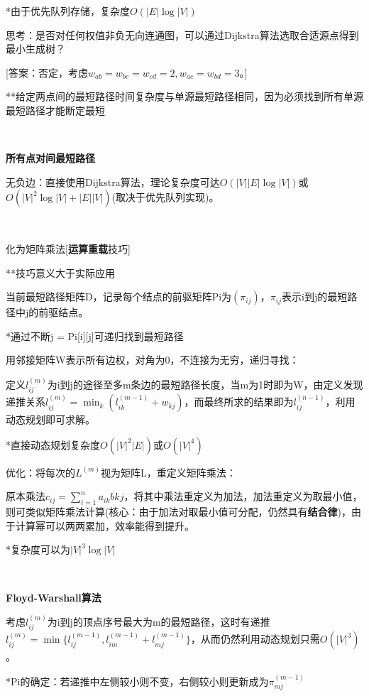 \documentclass[a4paper,UTF8,fontset=windows]{ctexart}
\begin{document}
*\hspace{0em}由于优先队列存储，复杂度$O(|E|\log|V|)$

思考：是否对任何权值非负无向连通图，可以通过Dijkstra算法选取合适源点得到最小生成树？

[答案：否定，考虑$w_{ab}=w_{bc}=w_{cd}=2,w_{ac}=w_{bd}=3$。]

**\hspace{0em}给定两点间的最短路径时间复杂度与单源最短路径相同，因为必须找到所有单源最短路径才能断定最短

\

\textbf{所有点对间最短路径}

无负边：直接使用Dijkstra算法，理论复杂度可达$O(|V||E|\log|V|)$或$O(|V|^2\log|V|+|E||V|)$(取决于优先队列实现)。

\

化为矩阵乘法[\textbf{运算重载}技巧]

**技巧意义大于实际应用

当前最短路径矩阵D，记录每个结点的前驱矩阵Pi为$(\pi_{ij})$，$\pi_{ij}$表示i到j的最短路径中j的前驱结点。

*\hspace{0em}通过不断j = Pi[i][j]可递归找到最短路径

用邻接矩阵W表示所有边权，对角为0，不连接为无穷，递归寻找：

定义$l_{ij}^{(m)}$为i到j的途径至多m条边的最短路径长度，当m为1时即为W，由定义发现递推关系$l_{ij}^{(m)}=\min_k(l_{ik}^{(m-1)}+w_{kj})$，而最终所求的结果即为$l_{ij}^{(n-1)}$，利用动态规划即可求解。

*\hspace{0em}直接动态规划复杂度$O(|V|^2|E|)$或$O(|V|^4)$

优化：将每次的$L^{(m)}$视为矩阵L，重定义矩阵乘法：

原本乘法$c_{ij}=\sum_{i=1}^na_{ik}b{kj}$，将其中乘法重定义为加法，加法重定义为取最小值，则可类似矩阵乘法计算(核心：由于加法对取最小值可分配，仍然具有\textbf{结合律})，由于计算幂可以两两累加，效率能得到提升。

*\hspace{0em}复杂度可以为$|V|^3\log|V|$

\

\textbf{Floyd-Warshall算法}

考虑$l_{ij}^{(m)}$为i到j的顶点序号最大为m的最短路径，这时有递推$l_{ij}^{(m)}=\min\{l_{ij}^{(m-1)},l_{im}^{(m-1)}+l_{mj}^{(m-1)}\}$，从而仍然利用动态规划只需$O(|V|^3)$。

*\hspace{0em}Pi的确定：若递推中左侧较小则不变，右侧较小则更新成为$\pi_{mj}^{(m-1)}$
\end{document}
